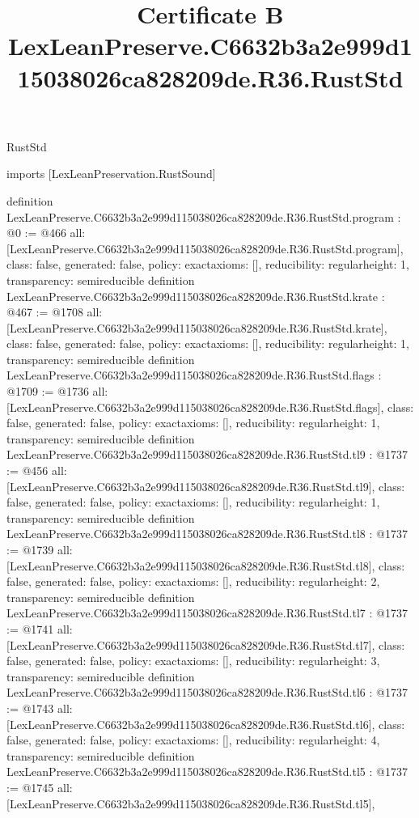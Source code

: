 \begin{lexlean}{RustStd}
\title{Certificate B LexLeanPreserve.C6632b3a2e999d115038026ca828209de.R36.RustStd}
\begin{coremodule}
imports [LexLeanPreservation.RustSound]

definition LexLeanPreserve.C6632b3a2e999d115038026ca828209de.R36.RustStd.program : @0 := @466 {
  all: [LexLeanPreserve.C6632b3a2e999d115038026ca828209de.R36.RustStd.program],
  class: false,
  generated: false,
  policy: exact{axioms: []},
  reducibility: regular{height: 1},
  transparency: semireducible
}
definition LexLeanPreserve.C6632b3a2e999d115038026ca828209de.R36.RustStd.krate : @467 := @1708 {
  all: [LexLeanPreserve.C6632b3a2e999d115038026ca828209de.R36.RustStd.krate],
  class: false,
  generated: false,
  policy: exact{axioms: []},
  reducibility: regular{height: 1},
  transparency: semireducible
}
definition LexLeanPreserve.C6632b3a2e999d115038026ca828209de.R36.RustStd.flags : @1709 := @1736 {
  all: [LexLeanPreserve.C6632b3a2e999d115038026ca828209de.R36.RustStd.flags],
  class: false,
  generated: false,
  policy: exact{axioms: []},
  reducibility: regular{height: 1},
  transparency: semireducible
}
definition LexLeanPreserve.C6632b3a2e999d115038026ca828209de.R36.RustStd.tl9 : @1737 := @456 {
  all: [LexLeanPreserve.C6632b3a2e999d115038026ca828209de.R36.RustStd.tl9],
  class: false,
  generated: false,
  policy: exact{axioms: []},
  reducibility: regular{height: 1},
  transparency: semireducible
}
definition LexLeanPreserve.C6632b3a2e999d115038026ca828209de.R36.RustStd.tl8 : @1737 := @1739 {
  all: [LexLeanPreserve.C6632b3a2e999d115038026ca828209de.R36.RustStd.tl8],
  class: false,
  generated: false,
  policy: exact{axioms: []},
  reducibility: regular{height: 2},
  transparency: semireducible
}
definition LexLeanPreserve.C6632b3a2e999d115038026ca828209de.R36.RustStd.tl7 : @1737 := @1741 {
  all: [LexLeanPreserve.C6632b3a2e999d115038026ca828209de.R36.RustStd.tl7],
  class: false,
  generated: false,
  policy: exact{axioms: []},
  reducibility: regular{height: 3},
  transparency: semireducible
}
definition LexLeanPreserve.C6632b3a2e999d115038026ca828209de.R36.RustStd.tl6 : @1737 := @1743 {
  all: [LexLeanPreserve.C6632b3a2e999d115038026ca828209de.R36.RustStd.tl6],
  class: false,
  generated: false,
  policy: exact{axioms: []},
  reducibility: regular{height: 4},
  transparency: semireducible
}
definition LexLeanPreserve.C6632b3a2e999d115038026ca828209de.R36.RustStd.tl5 : @1737 := @1745 {
  all: [LexLeanPreserve.C6632b3a2e999d115038026ca828209de.R36.RustStd.tl5],
}
\end{coremodule}
\end{lexlean}
